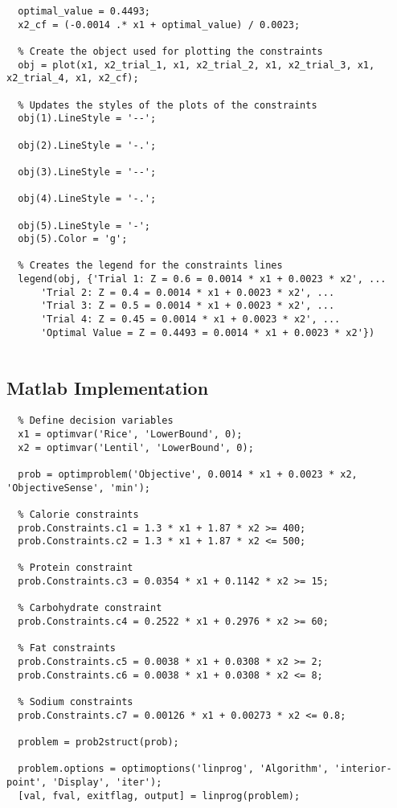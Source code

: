 \documentclass[
]{article}
\begin{document}
\begin{lstlisting}[numbers=none]
  % Compute optimal cost function line
  optimal_value = 0.4493;
  x2_cf = (-0.0014 .* x1 + optimal_value) / 0.0023;
  
  % Create the object used for plotting the constraints
  obj = plot(x1, x2_trial_1, x1, x2_trial_2, x1, x2_trial_3, x1, x2_trial_4, x1, x2_cf);
  
  % Updates the styles of the plots of the constraints
  obj(1).LineStyle = '--';
  
  obj(2).LineStyle = '-.';
  
  obj(3).LineStyle = '--';
  
  obj(4).LineStyle = '-.';
  
  obj(5).LineStyle = '-';
  obj(5).Color = 'g';
  
  % Creates the legend for the constraints lines
  legend(obj, {'Trial 1: Z = 0.6 = 0.0014 * x1 + 0.0023 * x2', ...
      'Trial 2: Z = 0.4 = 0.0014 * x1 + 0.0023 * x2', ...
      'Trial 3: Z = 0.5 = 0.0014 * x1 + 0.0023 * x2', ...
      'Trial 4: Z = 0.45 = 0.0014 * x1 + 0.0023 * x2', ...
      'Optimal Value = Z = 0.4493 = 0.0014 * x1 + 0.0023 * x2'})
  
\end{lstlisting}

\hypertarget{matlab-implementation}{%
	\subsection{Matlab Implementation}\label{matlab-implementation}}

\begin{lstlisting}
  % Define decision variables
  x1 = optimvar('Rice', 'LowerBound', 0);
  x2 = optimvar('Lentil', 'LowerBound', 0);
  
  prob = optimproblem('Objective', 0.0014 * x1 + 0.0023 * x2, 'ObjectiveSense', 'min');
  
  % Calorie constraints
  prob.Constraints.c1 = 1.3 * x1 + 1.87 * x2 >= 400;
  prob.Constraints.c2 = 1.3 * x1 + 1.87 * x2 <= 500;
  
  % Protein constraint
  prob.Constraints.c3 = 0.0354 * x1 + 0.1142 * x2 >= 15;
   
  % Carbohydrate constraint
  prob.Constraints.c4 = 0.2522 * x1 + 0.2976 * x2 >= 60;
   
  % Fat constraints
  prob.Constraints.c5 = 0.0038 * x1 + 0.0308 * x2 >= 2;
  prob.Constraints.c6 = 0.0038 * x1 + 0.0308 * x2 <= 8;
   
  % Sodium constraints
  prob.Constraints.c7 = 0.00126 * x1 + 0.00273 * x2 <= 0.8;
  
  problem = prob2struct(prob);
  
  problem.options = optimoptions('linprog', 'Algorithm', 'interior-point', 'Display', 'iter');
  [val, fval, exitflag, output] = linprog(problem);
\end{lstlisting}
\end{document}
